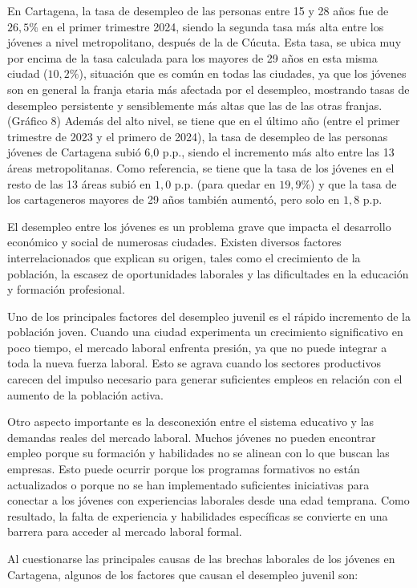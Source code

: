 \documentclass[letterpaper, 12pt]{article}
\begin{document}
En Cartagena, la tasa de desempleo de las personas entre 15 y 28 años fue de
$26,5\%$ en el primer trimestre 2024, siendo la segunda tasa más alta entre
los jóvenes a nivel metropolitano, después de la de Cúcuta. Esta tasa, se 
ubica muy por encima de la tasa calculada para los mayores de 29 años en esta
misma ciudad ($10,2\%$), situación que es común en todas las ciudades, ya que
los jóvenes son en general la franja etaria más afectada por el 
desempleo, mostrando tasas de desempleo persistente y sensiblemente más altas 
que las de las otras franjas. (Gráfico 8) Además del alto nivel, se tiene que 
en el último año (entre el primer trimestre de 2023 y el primero de 2024), la 
tasa de desempleo de las personas jóvenes de Cartagena subió 6,0 p.p., siendo 
el incremento más alto entre las 13 áreas metropolitanas. Como referencia, se 
tiene que la tasa de los jóvenes en el resto de las 13 áreas subió en $1,0$ 
p.p. (para quedar en $19,9\%$) y que la tasa de los cartageneros mayores 
de 29 años también aumentó, pero solo en $1,8$ p.p.

El desempleo entre los jóvenes es un problema grave que impacta el desarrollo 
económico y social de numerosas ciudades. Existen diversos factores 
interrelacionados que explican su origen, tales como el crecimiento de la 
población, la escasez de oportunidades laborales y las dificultades en la educación y formación profesional.

Uno de los principales factores del desempleo juvenil es el rápido incremento
de la población joven. Cuando una ciudad experimenta un crecimiento 
significativo en poco tiempo, el mercado laboral enfrenta presión, ya 
que no puede integrar a toda la nueva fuerza laboral. Esto se agrava 
cuando los sectores productivos carecen del impulso necesario para 
generar suficientes empleos en relación con el aumento de la población activa.

Otro aspecto importante es la desconexión entre el sistema educativo y las demandas 
reales del mercado laboral. Muchos jóvenes no pueden encontrar empleo porque su 
formación y habilidades no se alinean con lo que buscan las empresas. Esto puede 
ocurrir porque los programas formativos no están actualizados o porque no se han 
implementado suficientes iniciativas para conectar a los jóvenes con experiencias 
laborales desde una edad temprana. Como resultado, la falta de experiencia y 
habilidades específicas se convierte en una barrera para acceder al mercado laboral formal. 

Al cuestionarse las principales causas de las brechas laborales de los jóvenes en 
Cartagena, algunos de los factores que causan el desempleo juvenil son: 
\end{document}
